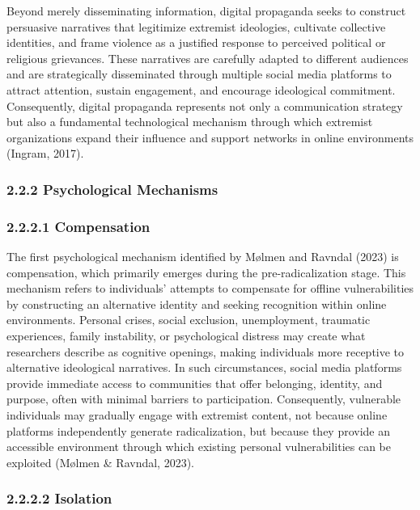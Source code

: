 \documentclass[10pt]{NSP1}
\begin{document}
	Beyond merely disseminating information, digital propaganda seeks to construct persuasive narratives that legitimize extremist ideologies, cultivate collective identities, and frame violence as a justified response to perceived political or religious grievances. These narratives are carefully adapted to different audiences and are strategically disseminated through multiple social media platforms to attract attention, sustain engagement, and encourage ideological commitment. Consequently, digital propaganda represents not only a communication strategy but also a fundamental technological mechanism through which extremist organizations expand their influence and support networks in online environments (Ingram, 2017).
	
	\subsubsection*{2.2.2 Psychological Mechanisms}
	
	\subsubsection*{2.2.2.1 Compensation}
	
	The first psychological mechanism identified by M\o lmen and Ravndal (2023) is compensation, which primarily emerges during the pre-radicalization stage. This mechanism refers to individuals' attempts to compensate for offline vulnerabilities by constructing an alternative identity and seeking recognition within online environments. Personal crises, social exclusion, unemployment, traumatic experiences, family instability, or psychological distress may create what researchers describe as cognitive openings, making individuals more receptive to alternative ideological narratives. In such circumstances, social media platforms provide immediate access to communities that offer belonging, identity, and purpose, often with minimal barriers to participation. Consequently, vulnerable individuals may gradually engage with extremist content, not because online platforms independently generate radicalization, but because they provide an accessible environment through which existing personal vulnerabilities can be exploited (M\o lmen \& Ravndal, 2023).
	
	\subsubsection*{2.2.2.2 Isolation}
	
\end{document}
